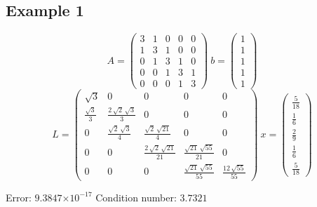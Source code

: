 \documentclass[12pt]{article}
\providecommand{\e}[1]{\ensuremath{\times 10^{#1}}}
\begin{document}
\subsection{Example 1}
$$A = \left(\begin{array}{ccccc} 3 & 1 & 0 & 0 & 0\\ 1 & 3 & 1 & 0 & 0\\ 0 & 1 & 3 & 1 & 0\\ 0 & 0 & 1 & 3 & 1\\ 0 & 0 & 0 & 1 & 3 \end{array}\right)\ 
b = \left(\begin{array}{c} 1\\ 1\\ 1\\ 1\\ 1 \end{array}\right)$$
$$L = \left(\begin{array}{ccccc} \sqrt{3} & 0 & 0 & 0 & 0\\ \frac{\sqrt{3}}{3} & \frac{2\,\sqrt{2}\,\sqrt{3}}{3} & 0 & 0 & 0\\ 0 & \frac{\sqrt{2}\,\sqrt{3}}{4} & \frac{\sqrt{2}\,\sqrt{21}}{4} & 0 & 0\\ 0 & 0 & \frac{2\,\sqrt{2}\,\sqrt{21}}{21} & \frac{\sqrt{21}\,\sqrt{55}}{21} & 0\\ 0 & 0 & 0 & \frac{\sqrt{21}\,\sqrt{55}}{55} & \frac{12\,\sqrt{55}}{55} \end{array}\right) \
x=\left(\begin{array}{c} \frac{5}{18}\\ \frac{1}{6}\\ \frac{2}{9}\\ \frac{1}{6}\\ \frac{5}{18} \end{array}\right)$$

Error: $9.3847\e{-17}$ Condition number: $3.7321$
\end{document}
